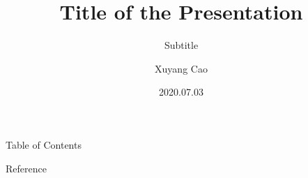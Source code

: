 \documentclass[t,11pt]{beamer} %
\title{Title of the Presentation}
\subtitle{Subtitle}
\institute{\url{https://github.com/xuyangcao}}
\author{Xuyang Cao}
\date{2020.07.03}
\begin{document}
\frame[plain]{\titlepage \addtocounter{framenumber}{-1}}        

\begin{frame}{Table of Contents}           %
    \setcounter{tocdepth}{2}               %
    \tableofcontents                       %
\end{frame}

 

\begin{frame}{Reference}
    \vspace{-0.5em}
    \nocite{*} %
    
    \tiny
\end{frame}
\end{document}
